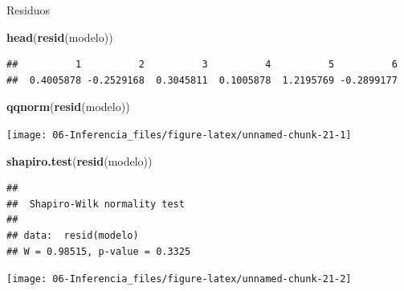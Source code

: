 \documentclass[]{book}
\newenvironment{Shaded}{\begin{snugshade}}{\end{snugshade}}
\newcommand{\CommentTok}[1]{\textcolor[rgb]{0.56,0.35,0.01}{\textit{#1}}}
\newcommand{\KeywordTok}[1]{\textcolor[rgb]{0.13,0.29,0.53}{\textbf{#1}}}
\newcommand{\NormalTok}[1]{#1}
\newcommand{\OperatorTok}[1]{\textcolor[rgb]{0.81,0.36,0.00}{\textbf{#1}}}
\begin{document}
Residuos

\begin{Shaded}
\begin{Highlighting}[]
\KeywordTok{head}\NormalTok{(}\KeywordTok{resid}\NormalTok{(modelo))}
\end{Highlighting}
\end{Shaded}

\begin{verbatim}
##          1          2          3          4          5          6 
##  0.4005878 -0.2529168  0.3045811  0.1005878  1.2195769 -0.2899177
\end{verbatim}

\begin{Shaded}
\begin{Highlighting}[]
\KeywordTok{qqnorm}\NormalTok{(}\KeywordTok{resid}\NormalTok{(modelo))}
\end{Highlighting}
\end{Shaded}

\begin{center}\texttt{[image: 06-Inferencia\_files/figure-latex/unnamed-chunk-21-1]} \end{center}

\begin{Shaded}
\begin{Highlighting}[]
\KeywordTok{shapiro.test}\NormalTok{(}\KeywordTok{resid}\NormalTok{(modelo))}
\end{Highlighting}
\end{Shaded}

\begin{verbatim}
## 
##  Shapiro-Wilk normality test
## 
## data:  resid(modelo)
## W = 0.98515, p-value = 0.3325
\end{verbatim}

\begin{Shaded}
\end{Shaded}

\begin{center}\texttt{[image: 06-Inferencia\_files/figure-latex/unnamed-chunk-21-2]} \end{center}
\end{document}
